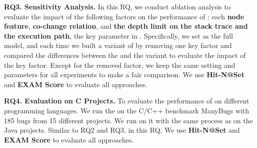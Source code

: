 {\bf RQ3. Sensitivity Analysis.}
In this RQ, we conduct ablation analysis to evaluate the impact of the following factors on the performance of {\tool}: each {\bf node feature}, {\bf co-change relation}, and {\bf the depth limit on the stack trace and the execution path}, the key parameter in {\tool}. Specifically, we set \tool as the full model, and each time we built a variant of {\tool} by removing one key factor and compared the differences between the \tool and the variant to evaluate the impact of the key factor. 
Except for the removed factor, we keep the same setting and parameters for all experiments to make a fair comparison. We use \textbf{Hit-N@Set} and \textbf{EXAM Score} to evaluate all approaches.

{\bf RQ4. Evaluation on C Projects.} To evaluate the performance of \tool on different programming languages. We run the \tool on the C/C++ benchmark ManyBugs \cite{manybugs} with 185 bugs from 15 different projects. We run \tool on it with the same process as on the Java projects. Similar to RQ2 and RQ3, in this RQ, We use \textbf{Hit-N@Set} and \textbf{EXAM Score} to evaluate all approaches. %
